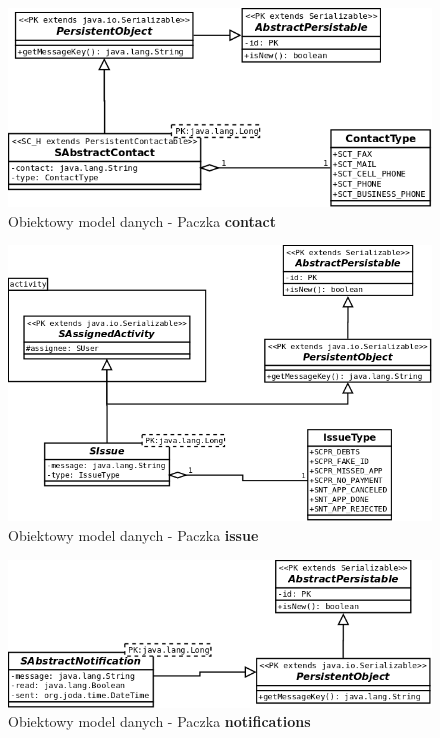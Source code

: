 	\begin{figure}[H]
		\centering
		\includegraphics[width=1.0\textwidth]{images/umls/contact}
		\caption[Obiektowy model danych - Paczka \textbf{contact}]{
			Obiektowy model danych - Paczka \textbf{contact}
		}
		\label{app:schema_contact_package}
	\end{figure}
	\begin{figure}[H]
		\centering
		\includegraphics[width=1.0\textwidth]{images/umls/issue}
		\caption[Obiektowy model danych - Paczka \textbf{issue}]{
			Obiektowy model danych - Paczka \textbf{issue}
		}
		\label{app:schema_issue_package}
	\end{figure}
	\begin{figure}[H]
		\centering
		\includegraphics[width=1.0\textwidth]{images/umls/notifications}
		\caption[Obiektowy model danych - Paczka \textbf{notifications}]{
			Obiektowy model danych - Paczka \textbf{notifications}
		}
		\label{app:schema_notifications_package}
	\end{figure}
